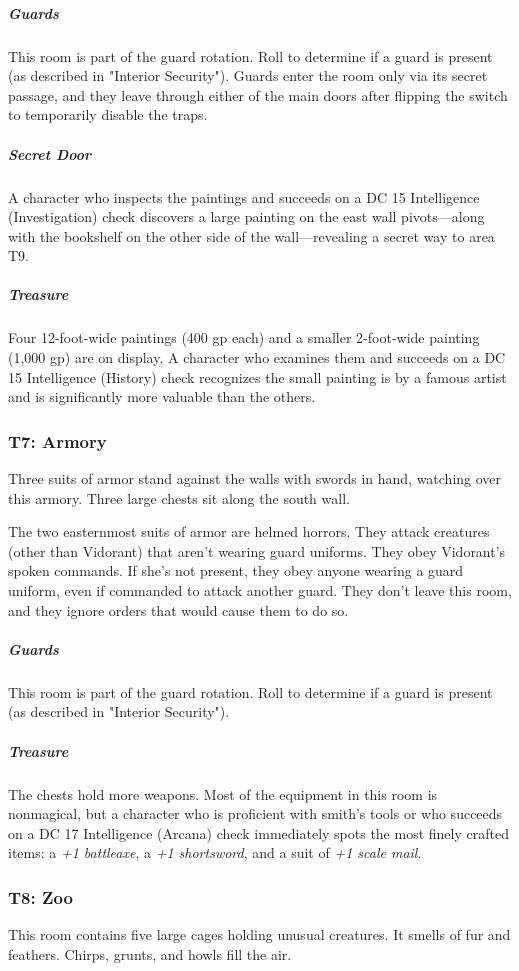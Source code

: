 \documentclass[10pt,a4paper,twoside,bg=print,twocolumn,openany,nodeprecatedcode]{dndbook}
\begin{document}
\subparagraph{Guards}
This room is part of the guard rotation. Roll to determine if a guard is present (as described in "Interior Security"). Guards enter the room only via its secret passage, and they leave through either of the main doors after flipping the switch to temporarily disable the traps.

\subparagraph{Secret Door}
A character who inspects the paintings and succeeds on a DC 15 Intelligence (Investigation) check discovers a large painting on the east wall pivots—along with the bookshelf on the other side of the wall—revealing a secret way to area T9.

\subparagraph{Treasure}
Four 12-foot-wide paintings (400 gp each) and a smaller 2-foot-wide painting (1,000 gp) are on display. A character who examines them and succeeds on a DC 15 Intelligence (History) check recognizes the small painting is by a famous artist and is significantly more valuable than the others.

\subsubsection{T7: Armory}
\begin{DndReadAloud}{}
Three suits of armor stand against the walls with swords in hand, watching over this armory. Three large chests sit along the south wall.

\end{DndReadAloud}

The two easternmost suits of armor are helmed horrors. They attack creatures (other than Vidorant) that aren't wearing guard uniforms. They obey Vidorant's spoken commands. If she's not present, they obey anyone wearing a guard uniform, even if commanded to attack another guard. They don't leave this room, and they ignore orders that would cause them to do so.

\subparagraph{Guards}
This room is part of the guard rotation. Roll to determine if a guard is present (as described in "Interior Security").

\subparagraph{Treasure}
The chests hold more weapons. Most of the equipment in this room is nonmagical, but a character who is proficient with smith's tools or who succeeds on a DC 17 Intelligence (Arcana) check immediately spots the most finely crafted items: a \textit{+1 battleaxe}, a \textit{+1 shortsword}, and a suit of \textit{+1 scale mail}.

\subsubsection{T8: Zoo}
\begin{DndReadAloud}{}
This room contains five large cages holding unusual creatures. It smells of fur and feathers. Chirps, grunts, and howls fill the air.

\end{DndReadAloud}
\end{document}
